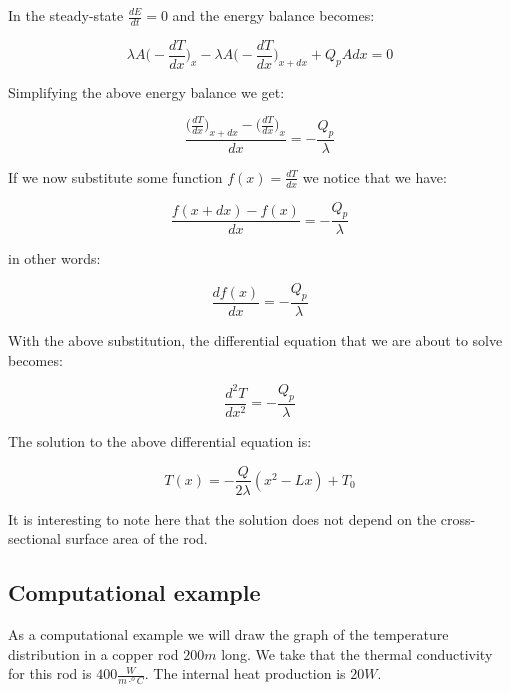 \documentclass[10pt]{article}
\begin{document}
In the steady-state $\frac{dE}{dt} = 0$ and the energy balance becomes:


\begin{equation}
\lambda A \Big(- \frac{dT}{dx} \Big)_x - \lambda A \Big(- \frac{dT}{dx} \Big)_{x + dx} + Q_p A dx = 0
\end{equation}

Simplifying the above energy balance we get:

\begin{equation*}
\frac{\Big(\frac{dT}{dx} \Big)_{x + dx} - \Big(\frac{dT}{dx} \Big)_x  }{dx} = - \frac{Q_p}{\lambda}
\end{equation*}

If we now substitute some function $f(x) = \frac{dT}{dx}$ we notice that we have:

\begin{equation*}
\frac{f(x + dx) - f(x)}{dx} = - \frac{Q_p}{\lambda}
\end{equation*}

in other words:

\begin{equation}
\frac{df(x)}{dx} = - \frac{Q_p}{\lambda}
\end{equation}

With the above substitution, the differential equation that we are about to solve becomes:

\begin{equation}
\frac{d^2T}{dx^2} = - \frac{Q_p}{\lambda}
\end{equation}

The solution to the above differential equation is:

\begin{equation}
T(x) = - \frac{Q}{2 \lambda} (x^2 - Lx) + T_0
\label{eq:solution}
\end{equation}

It is interesting to note here that the solution does not depend on the cross-sectional surface area of the rod.




\subsection*{Computational example}

As a computational example we will draw the graph of the temperature distribution in a copper rod $200 m$ long. We take that the thermal conductivity for this rod is $400 \frac{W}{m \cdot ^o C}$. The internal heat production is $20 W$.
\end{document}
